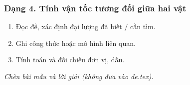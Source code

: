 \subsubsection{Dạng 4. Tính vận tốc tương đối giữa hai vật}
\begin{phuongphap}
\begin{enumerate}
\item Đọc đề, xác định đại lượng đã biết / cần tìm.
\item Ghi công thức hoặc mô hình liên quan.
\item Tính toán và đối chiếu đơn vị, dấu.
\end{enumerate}
\end{phuongphap}
\begin{vidumau}
\textit{Chèn bài mẫu và lời giải (không đưa vào de.tex).}
\end{vidumau}

